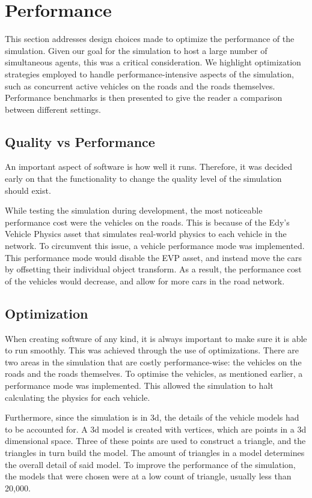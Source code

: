 \section{Performance}
    This section addresses design choices made to optimize the performance of the simulation. Given our goal for the simulation to host a large number of simultaneous agents, this was a critical consideration. We highlight optimization strategies employed to handle performance-intensive aspects of the simulation, such as concurrent active vehicles on the roads and the roads themselves. Performance benchmarks is then presented to give the reader a comparison between different settings. 

    \subsection{Quality vs Performance}
        An important aspect of software is how well it runs. Therefore, it was decided early on that the functionality to change the quality level of the simulation should exist. 
    
        While testing the simulation during development, the most noticeable performance cost were the vehicles on the roads. This is because of the Edy's Vehicle Physics asset that simulates real-world physics to each vehicle in the network. To circumvent this issue, a vehicle performance mode was implemented. This performance mode would disable the EVP asset, and instead move the cars by offsetting their individual object transform. As a result, the performance cost of the vehicles would decrease, and allow for more cars in the road network.
    
    \subsection{Optimization} 
        When creating software of any kind, it is always important to make sure it is able to run smoothly. This was achieved through the use of optimizations. There are two areas in the simulation that are costly performance-wise: the vehicles on the roads and the roads themselves. To optimise the vehicles, as mentioned earlier, a performance mode was implemented. This allowed the simulation to halt calculating the physics for each vehicle. 
    
        Furthermore, since the simulation is in 3d, the details of the vehicle models had to be accounted for. A 3d model is created with vertices, which are points in a 3d dimensional space. Three of these points are used to construct a triangle, and the triangles in turn build the model. The amount of triangles in a model determines the overall detail of said model. To improve the performance of the simulation, the models that were chosen were at a low count of triangle, usually less than 20,000. 

